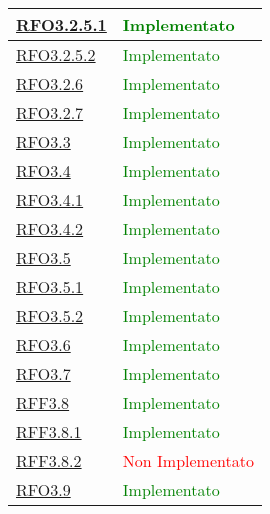 \begin{longtable}{|>{\centering}m{5cm}|m{5cm}<{\centering}|}
\hyperlink{RFO3.2.5.1}{RFO3.2.5.1} &  \textcolor{green}{Implementato}\\ \hline

\hyperlink{RFO3.2.5.2}{RFO3.2.5.2} &  \textcolor{green}{Implementato}\\ \hline

\hyperlink{RFO3.2.6}{RFO3.2.6} &  \textcolor{green}{Implementato}\\ \hline

\hyperlink{RFO3.2.7}{RFO3.2.7} &  \textcolor{green}{Implementato}\\ \hline

\hyperlink{RFO3.3}{RFO3.3} &  \textcolor{green}{Implementato}\\ \hline

\hyperlink{RFO3.4}{RFO3.4} &  \textcolor{green}{Implementato}\\ \hline

\hyperlink{RFO3.4.1}{RFO3.4.1} & \textcolor{green}{Implementato}\\ \hline

\hyperlink{RFO3.4.2}{RFO3.4.2} &  \textcolor{green}{Implementato}\\ \hline

\hyperlink{RFO3.5}{RFO3.5} &  \textcolor{green}{Implementato}\\ \hline

\hyperlink{RFO3.5.1}{RFO3.5.1} &  \textcolor{green}{Implementato}\\ \hline

\hyperlink{RFO3.5.2}{RFO3.5.2} & \textcolor{green}{Implementato}\\ \hline

\hyperlink{RFO3.6}{RFO3.6} &   \textcolor{green}{Implementato}\\ \hline

\hyperlink{RFO3.7}{RFO3.7} & \textcolor{green}{Implementato}\\ \hline

\hyperlink{RFF3.8}{RFF3.8} &  \textcolor{green}{Implementato}\\ \hline

\hyperlink{RFF3.8.1}{RFF3.8.1} &   \textcolor{green}{Implementato}\\ \hline

\hyperlink{RFF3.8.2}{RFF3.8.2} &  \textcolor{red}{Non Implementato}\\ \hline

\hyperlink{RFO3.9}{RFO3.9} &  \textcolor{green}{Implementato}\\ \hline


\end{longtable}
